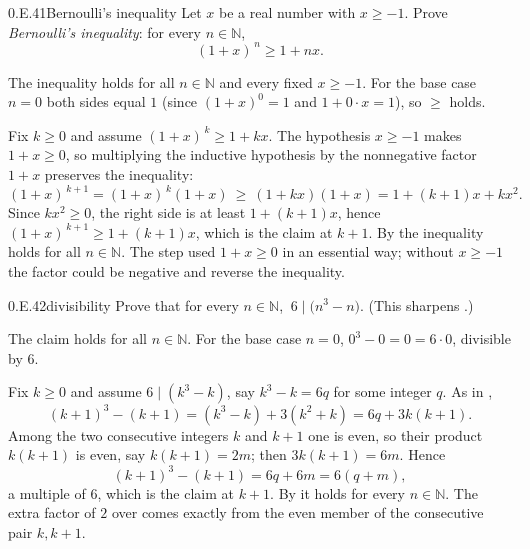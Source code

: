 \documentclass[main.tex]{subfiles}
\begin{document}
\begin{Exercise}{0.E.41}{Bernoulli's inequality}
Let $x$ be a real number with $x\ge -1$. Prove \emph{Bernoulli's inequality}: for every $n\in\mathbb
N$,
\[
(1+x)^{\,n}\ge 1+nx.
\]
\end{Exercise}
\begin{Solution}
The inequality holds for all $n\in\mathbb N$ and every fixed $x\ge -1$. For the base case $n=0$ both
sides equal $1$ (since $(1+x)^0=1$ and $1+0\cdot x=1$), so $\ge$ holds.

Fix $k\ge 0$ and assume $(1+x)^{\,k}\ge 1+kx$. The hypothesis $x\ge -1$ makes $1+x\ge 0$, so
multiplying the inductive hypothesis by the nonnegative factor $1+x$ preserves the inequality:
\[
(1+x)^{\,k+1}=(1+x)^{\,k}(1+x)\ \ge\ (1+kx)(1+x)=1+(k+1)x+kx^2.
\]
Since $kx^2\ge 0$, the right side is at least $1+(k+1)x$, hence
$(1+x)^{\,k+1}\ge 1+(k+1)x$, which is the claim at $k+1$. By  the inequality holds for all
$n\in\mathbb N$. The step used $1+x\ge 0$ in an essential way; without $x\ge -1$ the factor could be
negative and reverse the inequality.
\end{Solution}

\begin{Exercise}{0.E.42}{divisibility}
Prove that for every $n\in\mathbb N$, $\ 6\mid\bigl(n^3-n\bigr)$. (This sharpens .)
\end{Exercise}
\begin{Solution}
The claim holds for all $n\in\mathbb N$. For the base case $n=0$, $0^3-0=0=6\cdot 0$, divisible by $6$.

Fix $k\ge 0$ and assume $6\mid(k^3-k)$, say $k^3-k=6q$ for some integer $q$. As in ,
\[
(k+1)^3-(k+1)=(k^3-k)+3(k^2+k)=6q+3k(k+1).
\]
Among the two consecutive integers $k$ and $k+1$ one is even, so their product $k(k+1)$ is even, say
$k(k+1)=2m$; then $3k(k+1)=6m$. Hence
\[
(k+1)^3-(k+1)=6q+6m=6(q+m),
\]
a multiple of $6$, which is the claim at $k+1$. By  it holds for every $n\in\mathbb N$.
The extra factor of $2$ over  comes exactly from the even member of the consecutive pair
$k,k+1$.
\end{Solution}
\end{document}
